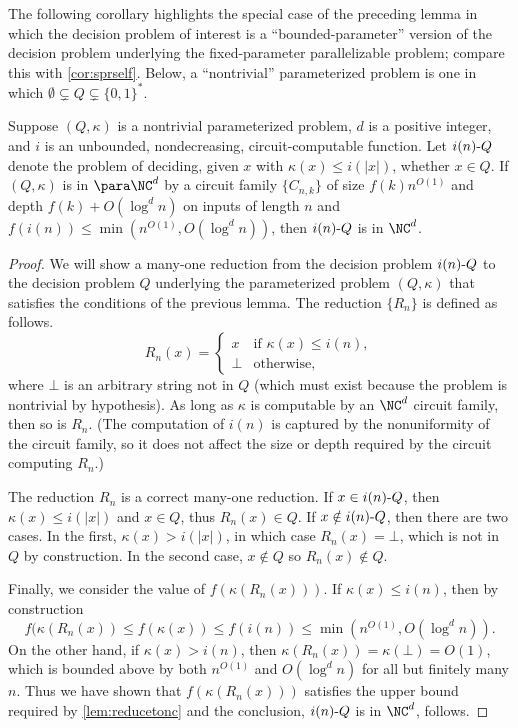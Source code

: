 The following corollary highlights the special case of the preceding lemma in which the decision problem of interest is a ``bounded-parameter'' version of the decision problem underlying the fixed-parameter parallelizable problem; compare this with \autoref{cor:sprself}.
Below, a ``nontrivial'' parameterized problem is one in which $\emptyset \subsetneq Q \subsetneq \{0, 1\}^*$.

\begin{corollary}\label{cor:reducetoself}
  Suppose $(Q, \kappa)$ is a nontrivial parameterized problem, $d$ is a positive integer, and $i$ is an unbounded, nondecreasing, circuit-computable function.
  Let $i(n) \textnormal{-} Q$ denote the problem of deciding, given $x$ with $\kappa(x) \leq i(|x|)$, whether $x \in Q$.
  If $(Q, \kappa)$ is in $\para \NC^d$ by a circuit family $\{C_{n, k}\}$ of size $f(k) n^{O(1)}$ and depth $f(k) + O(\log^d n)$ on inputs of length $n$ and $f(i(n)) \leq \min(n^{O(1)}, O(\log^d n))$, then $i(n) \textnormal{-} Q$ is in $\NC^d$.
\end{corollary}
\begin{proof}
  We will show a many-one reduction from the decision problem $i(n) \textnormal{-} Q$ to the decision problem $Q$ underlying the parameterized problem $(Q, \kappa)$ that satisfies the conditions of the previous lemma.
  The reduction $\{R_n\}$ is defined as follows.
  \[
  R_n(x) =
  \begin{cases}
    x & \text{if } \kappa(x) \leq i(n), \\
    \bot & \text{otherwise},
  \end{cases}
  \]
  where $\bot$ is an arbitrary string not in $Q$ (which must exist because the problem is nontrivial by hypothesis).
  As long as $\kappa$ is computable by an $\NC^d$ circuit family, then so is $R_n$.
  (The computation of $i(n)$ is captured by the nonuniformity of the circuit family, so it does not affect the size or depth required by the circuit computing $R_n$.)

  The reduction $R_n$ is a correct many-one reduction.
  If $x \in i(n) \textnormal{-} Q$, then $\kappa(x) \leq i(|x|)$ and $x \in Q$, thus $R_n(x) \in Q$.
  If $x \notin i(n) \textnormal{-} Q$, then there are two cases.
  In the first, $\kappa(x) > i(|x|)$, in which case $R_n(x) = \bot$, which is not in $Q$ by construction.
  In the second case, $x \notin Q$ so $R_n(x) \notin Q$.

  Finally, we consider the value of $f(\kappa(R_n(x)))$.
  If $\kappa(x) \leq i(n)$, then by construction
  \[
  f(\kappa(R_n(x)) \leq f(\kappa(x)) \leq f(i(n)) \leq \min(n^{O(1)}, O(\log^d n)).
  \]
  On the other hand, if $\kappa(x) > i(n)$, then $\kappa(R_n(x)) = \kappa(\bot) = O(1)$, which is bounded above by both $n^{O(1)}$ and $O(\log^d n)$ for all but finitely many $n$.
  Thus we have shown that $f(\kappa(R_n(x)))$ satisfies the upper bound required by \autoref{lem:reducetonc} and the conclusion, $i(n) \textnormal{-} Q$ is in $\NC^d$, follows.
\end{proof}

